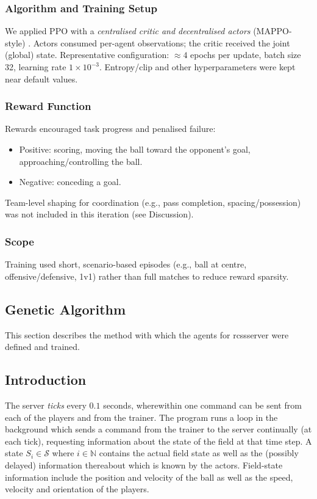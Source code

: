 \subsubsection{Algorithm and Training Setup}
We applied PPO with a \textit{centralised critic and decentralised actors} (MAPPO-style) \cite{Yu2021MAPPO}. Actors consumed per-agent observations; the critic received the joint (global) state. Representative configuration: \(\approx 4\) epochs per update, batch size 32, learning rate \(1\times10^{-3}\). Entropy/clip and other hyperparameters were kept near default values.

\subsubsection{Reward Function}
Rewards encouraged task progress and penalised failure:
\begin{itemize}
  \item Positive: scoring, moving the ball toward the opponent's goal, approaching/controlling the ball.
  \item Negative: conceding a goal.
\end{itemize}
Team-level shaping for coordination (e.g., pass completion, spacing/possession) was not included in this iteration (see Discussion).

\subsubsection{Scope}
Training used short, scenario-based episodes (e.g., ball at centre, offensive/defensive, 1v1) rather than full matches to reduce reward sparsity.

\subsection{Genetic Algorithm}

This section describes the method with which the agents for rcssserver were defined and trained.

\subsection{Introduction}
The server \textit{ticks} every \(0.1\) seconds, wherewithin one command can be sent from each of the players and from the trainer. The program runs a loop in the background which sends a command from the trainer to the server continually (at each tick), requesting information about the state of the field at that time step. A state \(S_i \in \mathcal{S}\) where \(i \in \mathbb{N}\) contains the actual field state as well as the (possibly delayed) information thereabout which is known by the actors. Field-state information include the position and velocity of the ball as well as the speed, velocity and orientation of the players.

